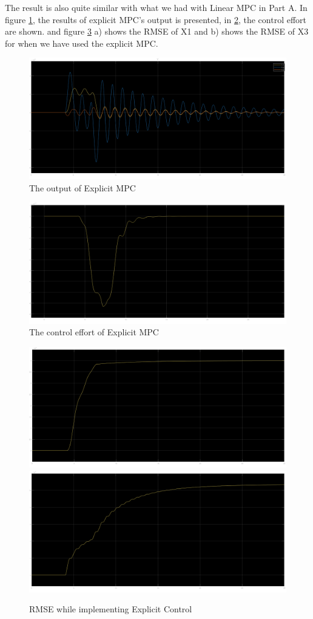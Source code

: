 \documentclass{article}
\begin{document}
The result is also quite similar with what we had with Linear MPC in Part A. In figure \ref{fig:ExplictOutput}, the results of explicit MPC's output is presented, in \ref{fig:ControlEffort}, the control effort are shown. and figure \ref{fig:RMSE} a) shows the RMSE of X1 and b) shows the RMSE of X3 for when we have used the explicit MPC.

\begin{figure}[htbp]
    \centering
    \includegraphics[width=\linewidth]{images/Explicit Output.png}
    \caption{The output of Explicit MPC}
    \label{fig:ExplictOutput}
\end{figure}

\begin{figure}[htbp]
    \centering
    \includegraphics[width=\linewidth]{images/Control Effort.png}
    \caption{The control effort of Explicit MPC}
    \label{fig:ControlEffort}
\end{figure}

\begin{figure}[htbp]
    \centering
    \includegraphics[width=0.5\linewidth]{images/ExplicitRMSE(X1).png}    
    \includegraphics[width=0.5\linewidth]{images/ExplicitRMSE(X3).png}
    \caption{RMSE while implementing Explicit Control}
    \label{fig:RMSE}
\end{figure}
\end{document}
